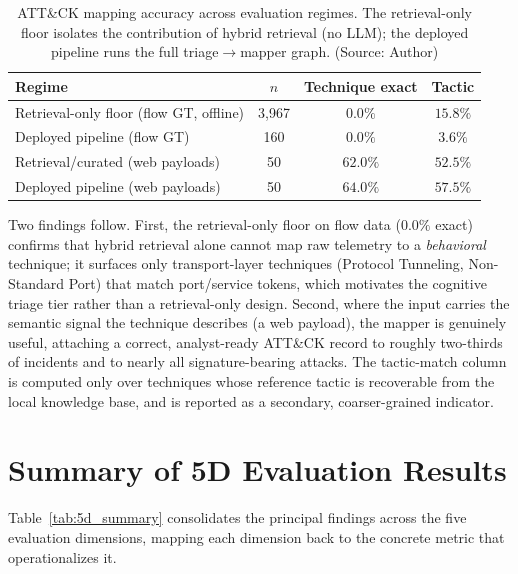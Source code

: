 \begin{table}[!htbp]
    \centering
    \footnotesize
    \caption{ATT\&CK mapping accuracy across evaluation regimes. The retrieval-only floor isolates the contribution of hybrid retrieval (no LLM); the deployed pipeline runs the full triage$\rightarrow$mapper graph. (Source: Author)}
    \label{tab:attack_mapper}
    \begin{tabular}{|>{\raggedright\arraybackslash}p{}|c|c|c|}
        \hline
        \textbf{Regime} & \textbf{$n$} & \textbf{Technique exact} & \textbf{Tactic} \\
        \hline
        Retrieval-only floor (flow GT, offline) & 3{,}967 & $0.0\%$ & $15.8\%$ \\
        \hline
        Deployed pipeline (flow GT) & 160 & $0.0\%$ & $3.6\%$ \\
        \hline
        Retrieval/curated (web payloads) & 50 & $62.0\%$ & $52.5\%$ \\
        \hline
        Deployed pipeline (web payloads) & 50 & $\mathbf{64.0\%}$ & $57.5\%$ \\
        \hline
    \end{tabular}
\end{table}

Two findings follow. First, the retrieval-only floor on flow data ($0.0\%$ exact) confirms that hybrid retrieval alone cannot map raw telemetry to a \emph{behavioral} technique; it surfaces only transport-layer techniques (Protocol Tunneling, Non-Standard Port) that match port/service tokens, which motivates the cognitive triage tier rather than a retrieval-only design. Second, where the input carries the semantic signal the technique describes (a web payload), the mapper is genuinely useful, attaching a correct, analyst-ready ATT\&CK record to roughly two-thirds of incidents and to nearly all signature-bearing attacks. The tactic-match column is computed only over techniques whose reference tactic is recoverable from the local knowledge base, and is reported as a secondary, coarser-grained indicator.

\section{Summary of 5D Evaluation Results}
Table~\ref{tab:5d_summary} consolidates the principal findings across the five evaluation dimensions, mapping each dimension back to the concrete metric that operationalizes it.

